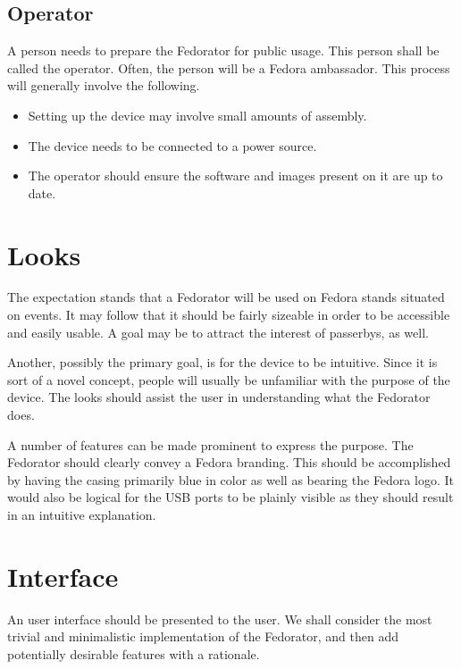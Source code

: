         \subsection{Operator}
            A person needs to prepare the Fedorator for public usage.  This person shall be called the operator.  Often, the person will be a Fedora ambassador.  This process will generally involve the following.
            
            \begin{itemize}
                \item Setting up the device may involve small amounts of assembly.
                \item The device needs to be connected to a power source.
                \item The operator should ensure the software and images present on it are up to date.
            \end{itemize}
    \section{Looks}
        The expectation stands that a Fedorator will be used on Fedora stands situated on events.  It may follow that it should be fairly sizeable in order to be accessible and easily usable.  A goal may be to attract the interest of passerbys, as well.
        
        Another, possibly the primary goal, is for the device to be intuitive.  Since it is sort of a novel concept, people will usually be unfamiliar with the purpose of the device.  The looks should assist the user in understanding what the Fedorator does.
        
        A number of features can be made prominent to express the purpose.  The Fedorator should clearly convey a Fedora branding.  This should be accomplished by having the casing primarily blue in color as well as bearing the Fedora logo.  It would also be logical for the USB ports to be plainly visible as they should result in an intuitive explanation.
        
        
        
    \section{Interface}
        An user interface should be presented to the user.  We shall consider the most trivial and minimalistic implementation of the Fedorator, and then add potentially desirable features with a rationale.
        
